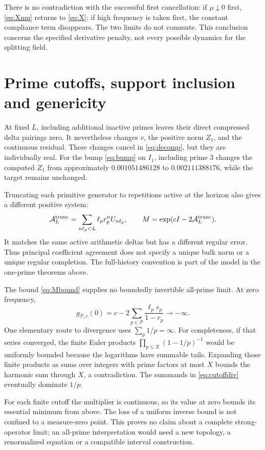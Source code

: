 \documentclass[11pt]{article}
\numberwithin{equation}{section}
\theoremstyle{definition}
\theoremstyle{remark}
\begin{document}
There is no contradiction with the successful first cancellation: if $\mu\downarrow0$ first, \eqref{eq:Xmu} returns to \eqref{eq:X}; if high frequency is taken first, the constant compliance term disappears. The two limits do not commute. This conclusion concerns the specified derivative penalty, not every possible dynamics for the splitting field.

\section{Prime cutoffs, support inclusion and genericity}
\label{sec:cutoffs}
At fixed $L$, including additional inactive primes leaves their direct compressed delta pairings zero. It nevertheless changes $v$, the positive norm $Z_1$, and the continuous residual. These changes cancel in \eqref{eq:decomp}, but they are individually real. For the bump \eqref{eq:bump} on $I_1$, including prime 3 changes the computed $Z_1$ from approximately $0.001051486128$ to $0.002111388176$, while the target remains unchanged.

Truncating each primitive generator to repetitions active at the horizon also gives a different positive system:
\begin{equation}
 \mathcal A_L^{\rm trunc}=
 \sum_{n\ell_p<L}\ell_pr_p^nU_{n\ell_p},\qquad
 M=\exp(cI-2\mathcal A_L^{\rm trunc}).
\end{equation}
It matches the same active arithmetic deltas but has a different regular error. Thus principal coefficient agreement does not specify a unique bulk norm or a unique regular completion. The full-history convention is part of the model in the one-prime theorems above.

The bound \eqref{eq:Mbound} supplies no boundedly invertible all-prime limit. At zero frequency,
\begin{equation}
 g_{\mathcal P,c}(0)=c-2\sum_{p\in\mathcal P}
 \frac{\ell_pr_p}{1-r_p}\longrightarrow-\infty.
 \label{eq:cutoffdiv}
\end{equation}
One elementary route to divergence uses $\sum_p1/p=\infty$. For completeness, if that series converged, the finite Euler products $\prod_{p\le X}(1-1/p)^{-1}$ would be uniformly bounded because the logarithms have summable tails. Expanding those finite products as sums over integers with prime factors at most $X$ bounds the harmonic sum through $X$, a contradiction. The summands in \eqref{eq:cutoffdiv} eventually dominate $1/p$.

For each finite cutoff the multiplier is continuous, so its value at zero bounds its essential minimum from above. The loss of a uniform inverse bound is not confined to a measure-zero point. This proves no claim about a complete strong-operator limit; an all-prime interpretation would need a new topology, a renormalized equation or a compatible interval construction.
\end{document}
